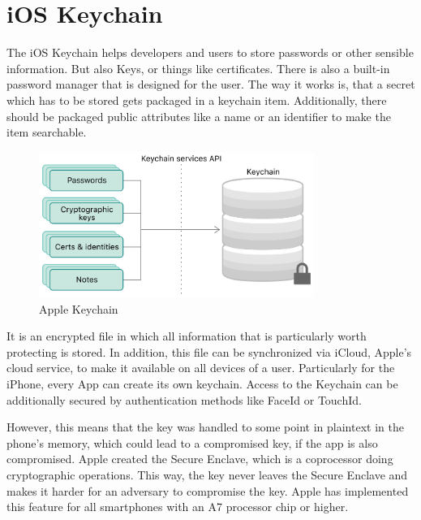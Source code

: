 \documentclass[12pt,oneside,a4paper,parskip]{scrbook}
\begin{document}

\section{iOS Keychain}

The iOS Keychain helps developers and users to store passwords or other sensible information. But also Keys, or things like certificates. There is also a built-in password manager that is designed for the user. The way it works is, that a secret which has to be stored gets packaged in a keychain item. Additionally, there should be packaged public attributes like a name or an identifier to make the item searchable. 

\begin{figure}[ht]
  \centering
  \includegraphics[width=0.8\textwidth]{ressources/apple_keychain.png}
  \caption{Apple Keychain \parencite{apple_keychain_2020}}
  \label{apple:keychain}
\end{figure}

It is an encrypted file in which all information that is particularly worth protecting is stored. In addition, this file can be synchronized via iCloud, Apple's cloud service, to make it available on all devices of a user. Particularly for the iPhone, every App can create its own keychain. Access to the Keychain can be additionally secured by authentication methods like FaceId or TouchId.

However, this means that the key was handled to some point in plaintext in the phone's memory, which could lead to a compromised key, if the app is also compromised. Apple created the Secure Enclave, which is a coprocessor doing cryptographic operations. This way, the key never leaves the Secure Enclave and makes it harder for an adversary to compromise the key.
Apple has implemented this feature for all smartphones with an A7 processor chip or higher.
\parencite{apple_keychain_2020}
\end{document}
